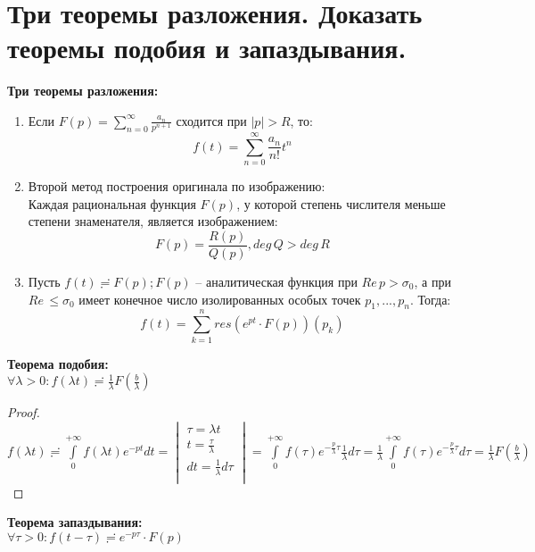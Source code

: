 \newpage
\section{Три теоремы разложения. Доказать теоремы подобия и запаздывания.}

\textbf{Три теоремы разложения:}
\begin{enumerate}
    \item Если $F(p) = \sum_{n=0}^\infty\frac{a_n}{p^{n+1}}$ сходится при $|p|>R$, то:
    $$f(t)=\sum_{n=0}^\infty\frac{a_n}{n!}t^n$$
    \item Второй метод построения оригинала по изображению:\\
    Каждая рациональная функция $F(p)$, у которой степень числителя меньше степени знаменателя, является изображением:
    $$F(p)=\frac{R(p)}{Q(p)}, deg\,Q>deg\,R$$
    \item Пусть $f(t)\risingdotseq F(p); F(p)$ -- аналитическая функция при $Re\,p>\sigma_0$, а при $Re\,\leq \sigma_0$ имеет конечное число изолированных особых точек $p_1, ..., p_n$. Тогда:
    $$f(t)=\sum_{k=1}^{n}res(e^{pt}\cdot F(p))(p_k)$$
\end{enumerate}

\textbf{Теорема подобия:}\\
$\forall \lambda > 0: f(\lambda t) \risingdotseq \frac{1}{\lambda} F\left(\frac{b}{\lambda}\right)$

\begin{proof}
    \ \\
    $f(\lambda t)\risingdotseq \int\limits_{0}^{+\infty}f(\lambda t)e^{-pt}dt =
    \begin{vmatrix}
        \tau=\lambda t\\
        t=\frac{\tau}{\lambda}\\
        dt=\frac{1}{\lambda}d\tau\\
    \end{vmatrix}
    = \int\limits_0^{+\infty} f(\tau)e^{-\frac{p}{\lambda}\tau}\frac{1}{\lambda}d\tau = \frac{1}{\lambda}\int\limits_0^{+\infty}f(\tau)e^{-\frac{p}{\lambda}\tau}d\tau=\frac{1}{\lambda} F\left(\frac{b}{\lambda}\right)$
\end{proof}

\textbf{Теорема запаздывания:}\\
$\forall \tau > 0: f(t-\tau) \risingdotseq e^{-p\tau}\cdot F(p)$
    
